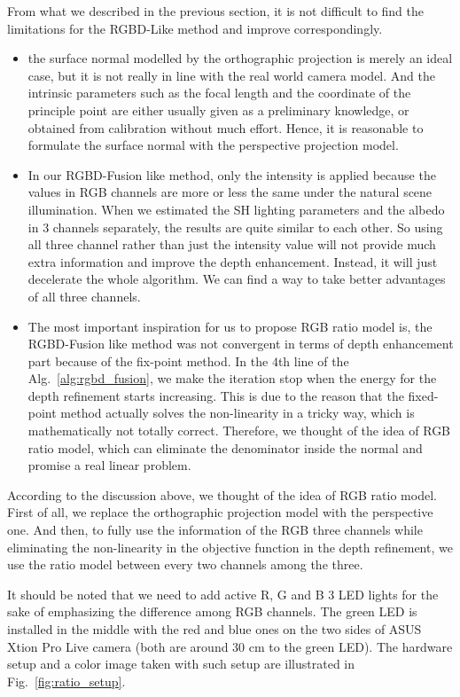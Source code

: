 From what we described in the previous section, it is not difficult to find the limitations for the RGBD-Like method and improve correspondingly.
\begin{itemize}
\item the surface normal modelled by the orthographic projection is merely an ideal case, but it is not really in line with the real world camera model.
And the intrinsic parameters such as the focal length and the coordinate of the principle point are either usually given as a preliminary knowledge, or obtained from calibration without much effort.
Hence, it is reasonable to formulate the surface normal with the perspective projection model.

\item In our RGBD-Fusion like method, only the intensity is applied because the values in RGB channels are more or less the same under the natural scene illumination. 
When we estimated the SH lighting parameters and the albedo in 3 channels separately, the results are quite similar to each other.
So using all three channel rather than just the intensity value will not provide much extra information and improve the depth enhancement. 
Instead, it will just decelerate the whole algorithm.
We can find a way to take better advantages of all three channels.

\item The most important inspiration for us to propose RGB ratio model is, the RGBD-Fusion like method was not convergent in terms of depth enhancement part because of the fix-point method.
In the $4$th line of the Alg.~\ref{alg:rgbd_fusion}, we make the iteration stop when the energy for the depth refinement starts increasing.
This is due to the reason that the fixed-point method actually solves the non-linearity in a tricky way, which is mathematically not totally correct. 
Therefore, we thought of the idea of RGB ratio model, which can eliminate the denominator inside the normal and promise a real linear problem.

\end{itemize}

According to the discussion above, we thought of the idea of RGB ratio model.
First of all, we replace the orthographic projection model with the perspective one.
And then, to fully use the information of the RGB three channels while eliminating the non-linearity in the objective function in the depth refinement, we use the ratio model between every two channels among the three.

It should be noted that we need to add active R, G and B 3 LED lights for the sake of emphasizing the difference among RGB channels.
The green LED is installed in the middle with the red and blue ones on the two sides of ASUS Xtion Pro Live camera (both are around 30 cm to the green LED).
The hardware setup and a color image taken with such setup are illustrated in Fig.~\ref{fig:ratio_setup}.

